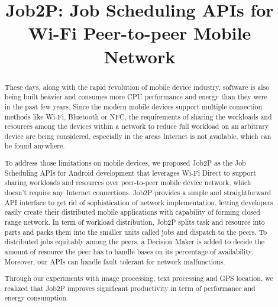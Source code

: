 \documentclass[conference]{IEEEtran}
\begin{document}
%
\title{Job2P: Job Scheduling APIs for\\Wi-Fi Peer-to-peer Mobile Network}


\author{
\and
{}
}


\maketitle

\begin{abstract}
These days, along with the rapid revolution of mobile device industry, software is also being built heavier and consumes more CPU performance and energy than they were in the past few years. Since the modern mobile devices support multiple connection methods like Wi-Fi, Bluetooth or NFC, the requirements of sharing the workloads and resources among the devices within a network to reduce full workload on an arbitrary device are being considered, especially in the areas Internet is not available, which can be found anywhere.

To address those limitations on mobile devices, we proposed Job2P as the Job Scheduling APIs for Android development that leverages Wi-Fi Direct to support sharing workloads and resources over peer-to-peer mobile device network, which doesn't require any Internet connections. Job2P provides a simple and straightforward API interface to get rid of sophistication of network implementation, letting developers easily create their distributed mobile applications with capability of forming closed range network. In term of workload distribution, Job2P splits task and resource into parts and packs them into the smaller units called jobs and dispatch to the peers. To distributed jobs equitably among the peers, a Decision Maker is added to decide the amount of resource the peer has to handle bases on its percentage of availability. Moreover, our APIs can handle fault tolerant for network malfunctions. 

Through our experiments with image processing, text processing and GPS location, we realized that Job2P improves significant productivity in term of performance and energy consumption. 
\end{abstract}
\end{document}
